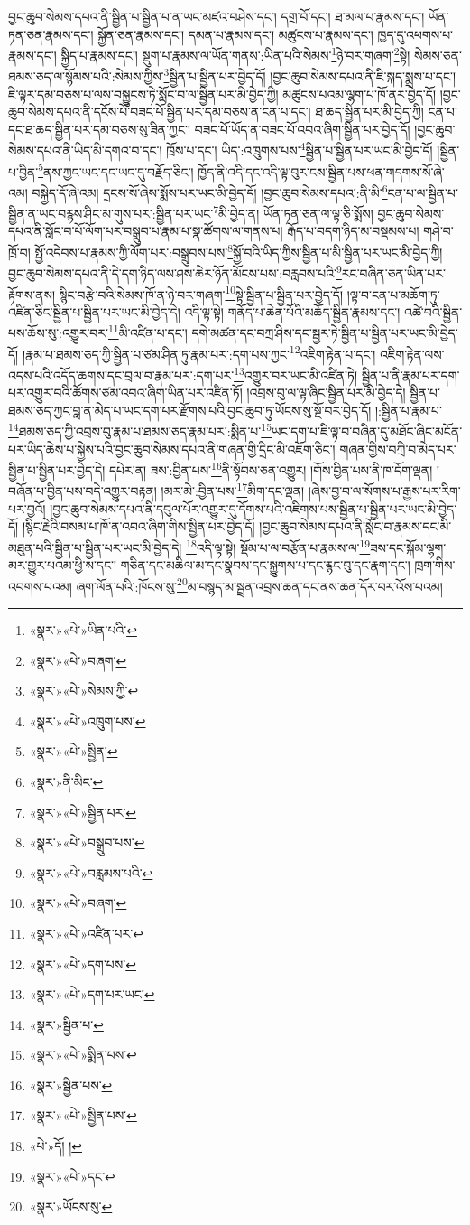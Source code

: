 བྱང་ཆུབ་སེམས་དཔའ་ནི་སྦྱིན་པ་སྦྱིན་པ་ན་ཡང་མཛའ་བཤེས་དང་། དགྲ་བོ་དང་། ཐ་མལ་པ་རྣམས་དང་། ཡོན་ཏན་ཅན་རྣམས་དང་། སྐྱོན་ཅན་རྣམས་དང་། དམན་པ་རྣམས་དང་། མཚུངས་པ་རྣམས་དང་། ཁྱད་དུ་འཕགས་པ་རྣམས་དང་། སྐྱིད་པ་རྣམས་དང་། སྡུག་པ་རྣམས་ལ་ཡོན་གནས་:ཡིན་པའི་སེམས་\footnote{«སྣར་»«པེ་»ཡིན་པའི་}ཉེ་བར་གཞག་\footnote{«སྣར་»«པེ་»བཞག་}སྟེ། སེམས་ཅན་ཐམས་ཅད་ལ་སྙོམས་པའི་:སེམས་ཀྱིས་\footnote{«སྣར་»«པེ་»སེམས་ཀྱི་}སྦྱིན་པ་སྦྱིན་པར་བྱེད་དོ། །བྱང་ཆུབ་སེམས་དཔའ་ནི་ཇི་སྐད་སྨྲས་པ་དང་། ཇི་ལྟར་དམ་བཅས་པ་ལས་བསྐྱུངས་ཏེ་སློང་བ་ལ་སྦྱིན་པར་མི་བྱེད་ཀྱི། མཚུངས་པའམ་ལྷག་པ་ཁོ་ནར་བྱེད་དོ། །བྱང་ཆུབ་སེམས་དཔའ་ནི་དངོས་པོ་བཟང་པོ་སྦྱིན་པར་དམ་བཅས་ན་ངན་པ་དང་། ཐ་ཆད་སྦྱིན་པར་མི་བྱེད་ཀྱི། ངན་པ་དང་ཐ་ཆད་སྦྱིན་པར་དམ་བཅས་སུ་ཟིན་ཀྱང་། བཟང་པོ་ཡོད་ན་བཟང་པོ་འབའ་ཞིག་སྦྱིན་པར་བྱེད་དོ། །བྱང་ཆུབ་སེམས་དཔའ་ནི་ཡིད་མི་དགའ་བ་དང་། ཁྲོས་པ་དང་། ཡིད་:འཁྲུགས་པས་\footnote{«སྣར་»«པེ་»འཁྲུག་པས་}སྦྱིན་པ་སྦྱིན་པར་ཡང་མི་བྱེད་དོ། །སྦྱིན་པ་བྱིན་\footnote{«སྣར་»«པེ་»སྦྱིན་}ནས་ཀྱང་ཡང་དང་ཡང་དུ་བརྗོད་ཅིང་། ཁྱོད་ནི་འདི་དང་འདི་ལྟ་བུར་ངས་སྦྱིན་པས་ཕན་གདགས་སོ་ཞེ་འམ། བསྐྱེད་དོ་ཞེ་འམ། དྲངས་སོ་ཞེས་སྨོས་པར་ཡང་མི་བྱེད་དོ། །བྱང་ཆུབ་སེམས་དཔའ་:ནི་མི་\footnote{«སྣར་»ནི་མིང་}ངན་པ་ལ་སྦྱིན་པ་སྦྱིན་ན་ཡང་བརྙས་ཤིང་མ་གུས་པར་:སྦྱིན་པར་ཡང་\footnote{«སྣར་»«པེ་»སྦྱིན་པར་}མི་བྱེད་ན། ཡོན་ཏན་ཅན་ལ་ལྟ་ཅི་སྨོས། བྱང་ཆུབ་སེམས་དཔའ་ནི་སློང་བ་པོ་ལོག་པར་བསྒྲུབ་པ་རྣམ་པ་སྣ་ཚོགས་ལ་གནས་པ། རྒོད་པ་བདག་ཉིད་མ་བསྡམས་པ། གཤེ་བ་ཁྲོ་བ། སྤྱོ་འདེབས་པ་རྣམས་ཀྱི་ལོག་པར་:བསྒྲུབས་པས་\footnote{«སྣར་»«པེ་»བསྒྲུབ་པས་}སྐྱོ་བའི་ཡིད་ཀྱིས་སྦྱིན་པ་མི་སྦྱིན་པར་ཡང་མི་བྱེད་ཀྱི། བྱང་ཆུབ་སེམས་དཔའ་ནི་དེ་དག་ཉིད་ལས་ཤས་ཆེར་ཉོན་མོངས་པས་:བརླབས་པའི་\footnote{«སྣར་»«པེ་»བརླམས་པའི་}རང་བཞིན་ཅན་ཡིན་པར་རྟོགས་ནས། སྙིང་བརྩེ་བའི་སེམས་ཁོ་ན་ཉེ་བར་གཞག་\footnote{«སྣར་»«པེ་»བཞག་}སྟེ་སྦྱིན་པ་སྦྱིན་པར་བྱེད་དོ། །ལྟ་བ་ངན་པ་མཆོག་ཏུ་འཛིན་ཅིང་སྦྱིན་པ་སྦྱིན་པར་ཡང་མི་བྱེད་དེ། འདི་ལྟ་སྟེ། གནོད་པ་ཆེན་པོའི་མཆོད་སྦྱིན་རྣམས་དང་། འཚེ་བའི་སྦྱིན་པས་ཆོས་སུ་:འགྱུར་བར་\footnote{«སྣར་»«པེ་»འཛིན་པར་}མི་འཛིན་པ་དང་། དགེ་མཚན་དང་བཀྲ་ཤིས་དང་སྦྱར་ཏེ་སྦྱིན་པ་སྦྱིན་པར་ཡང་མི་བྱེད་དོ། །རྣམ་པ་ཐམས་ཅད་ཀྱི་སྦྱིན་པ་ཙམ་ཤིན་ཏུ་རྣམ་པར་:དག་པས་ཀྱང་\footnote{«སྣར་»«པེ་»དག་པས་}འཇིག་རྟེན་པ་དང་། འཇིག་རྟེན་ལས་འདས་པའི་འདོད་ཆགས་དང་བྲལ་བ་རྣམ་པར་:དག་པར་\footnote{«སྣར་»«པེ་»དག་པར་ཡང་}འགྱུར་བར་ཡང་མི་འཛིན་ཏེ། སྦྱིན་པ་ནི་རྣམ་པར་དག་པར་འགྱུར་བའི་ཚོགས་ཙམ་འབའ་ཞིག་ཡིན་པར་འཛིན་ཏོ། །འབྲས་བུ་ལ་ལྟ་ཞིང་སྦྱིན་པར་མི་བྱེད་དེ། སྦྱིན་པ་ཐམས་ཅད་ཀྱང་བླ་ན་མེད་པ་ཡང་དག་པར་རྫོགས་པའི་བྱང་ཆུབ་ཏུ་ཡོངས་སུ་སྔོ་བར་བྱེད་དོ། །:སྦྱིན་པ་རྣམ་པ་\footnote{«སྣར་»སྦྱིན་པ་}ཐམས་ཅད་ཀྱི་འབྲས་བུ་རྣམ་པ་ཐམས་ཅད་རྣམ་པར་:སྨིན་པ་\footnote{«སྣར་»«པེ་»སྨིན་པས་}ཡང་དག་པ་ཇི་ལྟ་བ་བཞིན་དུ་མཐོང་ཞིང་མངོན་པར་ཡིད་ཆེས་པ་སྐྱེས་པའི་བྱང་ཆུབ་སེམས་དཔའ་ནི་གཞན་གྱི་དྲིང་མི་འཇོག་ཅིང་། གཞན་གྱིས་བཀྲི་བ་མེད་པར་སྦྱིན་པ་སྦྱིན་པར་བྱེད་དེ། དཔེར་ན། ཟས་:བྱིན་པས་\footnote{«སྣར་»སྦྱིན་པས་}ནི་སྟོབས་ཅན་འགྱུར། །གོས་བྱིན་པས་ནི་ཁ་དོག་ལྡན། །བཞོན་པ་བྱིན་པས་བདེ་འགྱུར་བརྟན། །མར་མེ་:བྱིན་པས་\footnote{«སྣར་»«པེ་»སྦྱིན་པས་}མིག་དང་ལྡན། །ཞེས་བྱ་བ་ལ་སོགས་པ་རྒྱས་པར་རིག་པར་བྱའོ། །བྱང་ཆུབ་སེམས་དཔའ་ནི་དབུལ་པོར་འགྱུར་དུ་དོགས་པའི་འཇིགས་པས་སྦྱིན་པ་སྦྱིན་པར་ཡང་མི་བྱེད་དོ། །སྙིང་རྗེའི་བསམ་པ་ཁོ་ན་འབའ་ཞིག་གིས་སྦྱིན་པར་བྱེད་དོ། །བྱང་ཆུབ་སེམས་དཔའ་ནི་སློང་བ་རྣམས་དང་མི་མཐུན་པའི་སྦྱིན་པ་སྦྱིན་པར་ཡང་མི་བྱེད་དེ། \footnote{«པེ་»དོ། ། }འདི་ལྟ་སྟེ། སྡོམ་པ་ལ་བརྩོན་པ་རྣམས་ལ་\footnote{«སྣར་»«པེ་»དང་}ཟས་དང་སྐོམ་ལྷག་མར་གྱུར་པའམ་ཕྱི་ས་དང་། གཅིན་དང་མཆིལ་མ་དང་སྣབས་དང་སྐྱུགས་པ་དང་རྙང་བུ་དང་རྣག་དང་། ཁྲག་གིས་འབགས་པའམ། ཞག་ལོན་པའི་:ཁོངས་སུ་\footnote{«སྣར་»ཡོངས་སུ་}མ་བསྙད་མ་སྦྲན་འབྲས་ཆན་དང་ནས་ཆན་དོར་བར་འོས་པའམ། 